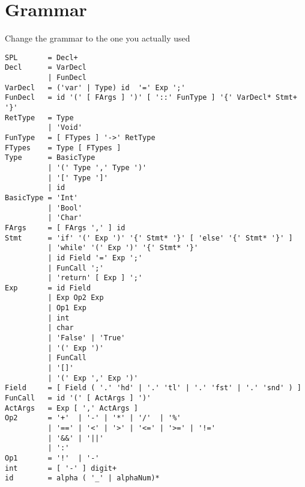 \documentclass{report}
\begin{document}


\appendix
\chapter{Grammar}
Change the grammar to the one you actually used

\begin{verbatim}
SPL       = Decl+
Decl      = VarDecl
          | FunDecl
VarDecl   = ('var' | Type) id  '=' Exp ';'
FunDecl   = id '(' [ FArgs ] ')' [ '::' FunType ] '{' VarDecl* Stmt+ '}'
RetType   = Type
          | 'Void'
FunType   = [ FTypes ] '->' RetType
FTypes    = Type [ FTypes ]
Type      = BasicType
          | '(' Type ',' Type ')'
          | '[' Type ']'
          | id
BasicType = 'Int'
          | 'Bool'
          | 'Char'
FArgs     = [ FArgs ',' ] id
Stmt      = 'if' '(' Exp ')' '{' Stmt* '}' [ 'else' '{' Stmt* '}' ]
          | 'while' '(' Exp ')' '{' Stmt* '}'
          | id Field '=' Exp ';'
          | FunCall ';'
          | 'return' [ Exp ] ';'
Exp       = id Field
          | Exp Op2 Exp
          | Op1 Exp
          | int
          | char
          | 'False' | 'True'
          | '(' Exp ')'
          | FunCall
          | '[]'
          | '(' Exp ',' Exp ')'
Field     = [ Field ( '.' 'hd' | '.' 'tl' | '.' 'fst' | '.' 'snd' ) ]
FunCall   = id '(' [ ActArgs ] ')'
ActArgs   = Exp [ ',' ActArgs ]
Op2       = '+'  | '-' | '*' | '/'  | '%'
          | '==' | '<' | '>' | '<=' | '>=' | '!='
          | '&&' | '||'
          | ':'
Op1       = '!'  | '-'
int       = [ '-' ] digit+
id        = alpha ( '_' | alphaNum)*
\end{verbatim}
\end{document}
